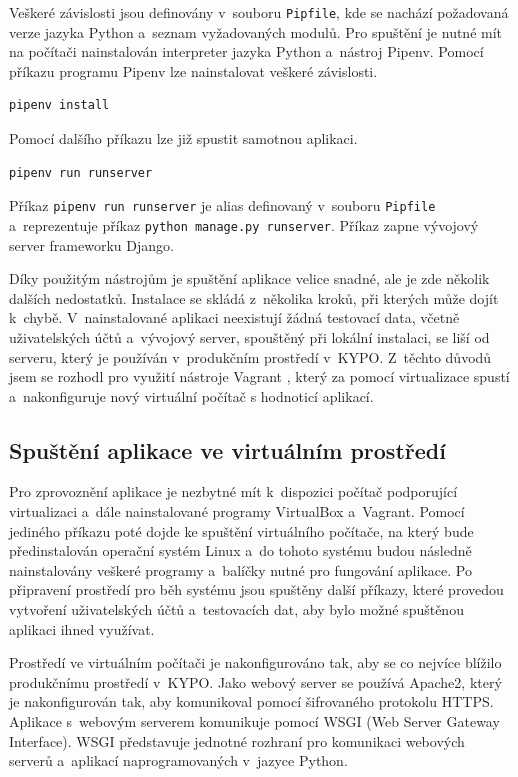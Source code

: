 \documentclass[
  digital,
  twoside,
  table, 
  nolof, 
  nolot
]{fithesis3}
\begin{document}
Veškeré závislosti jsou definovány v~souboru \texttt{Pipfile}, kde se nachází požadovaná verze jazyka Python a~seznam vyžadovaných modulů. Pro spuštění je nutné mít na počítači nainstalován interpreter jazyka Python a~nástroj Pipenv. Pomocí příkazu programu Pipenv lze nainstalovat veškeré závislosti.

\begin{lstlisting}
pipenv install
\end{lstlisting}

Pomocí dalšího příkazu lze již spustit samotnou aplikaci.

\begin{lstlisting}
pipenv run runserver
\end{lstlisting}

Příkaz \lstinline[columns=fixed]{pipenv run runserver} je alias definovaný v~souboru \texttt{Pipfile} a~reprezentuje příkaz \lstinline[columns=fixed]{python manage.py runserver}. Příkaz zapne vývojový server frameworku Django.

Díky použitým nástrojům je spuštění aplikace velice snadné, ale je zde několik dalších nedostatků. Instalace se skládá z~několika kroků, při kterých může dojít k~chybě. V~nainstalované aplikaci neexistují žádná testovací data, včetně uživatelských účtů a~vývojový server, spouštěný při lokální instalaci, se liší od serveru, který je používán v~produkčním prostředí v~KYPO. Z~těchto důvodů jsem se rozhodl pro využití nástroje Vagrant \cite{vagrant}, který za pomocí virtualizace spustí a~nakonfiguruje nový virtuální počítač s hodnoticí aplikací.

\subsection{Spuštění aplikace ve virtuálním prostředí}

Pro zprovoznění aplikace je nezbytné mít k~dispozici počítač podporující virtualizaci a~dále nainstalované programy VirtualBox \cite{virtualbox} a~Vagrant. Pomocí jediného příkazu poté dojde ke spuštění virtuálního počítače, na který bude předinstalován operační systém Linux a~do tohoto systému budou následně nainstalovány veškeré programy a~balíčky nutné pro fungování aplikace. Po připravení prostředí pro běh systému jsou spuštěny další příkazy, které provedou vytvoření uživatelských účtů a~testovacích dat, aby bylo možné spuštěnou aplikaci ihned využívat. 

Prostředí ve virtuálním počítači je nakonfigurováno tak, aby se co nejvíce blížilo produkčnímu prostředí v~KYPO. Jako webový server se používá Apache2, který je nakonfigurován tak, aby komunikoval pomocí šifrovaného protokolu HTTPS. Aplikace s~webovým serverem komunikuje pomocí WSGI (Web Server Gateway Interface). WSGI představuje jednotné rozhraní pro komunikaci webových serverů a~aplikací naprogramovaných v~jazyce Python.
\end{document}
